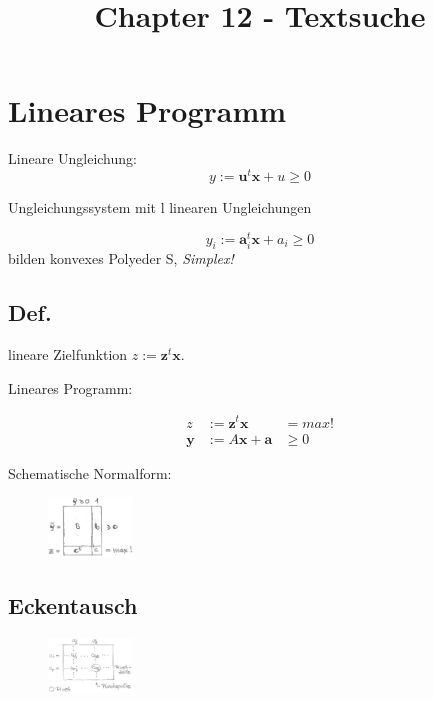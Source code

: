\documentclass[8pt, DIV15, twocolumn]{scrartcl}
\title{Chapter 12 - Textsuche}
\date{}
\begin{document}
\setlength{\abovedisplayskip}{0pt}
\setlength{\belowdisplayskip}{0pt}
\setlength{\parskip}{0pt}
\setlength{\topmargin}{0pt}

 
\maketitle

\thispagestyle{empty}


\section*{Lineares Programm}
Lineare Ungleichung:
\begin{equation*}
y := \mathbf{u}^t \mathbf{x} + u \geq 0
\end{equation*} 

Ungleichungssystem mit l linearen Ungleichungen

\begin{equation*}
y_i := \mathbf{a}_i^t \mathbf{x} + a_i \geq 0
\end{equation*} 
bilden konvexes Polyeder S, \emph{Simplex!}

\subsection*{Def.}
lineare Zielfunktion $z := \mathbf{z}^t \mathbf{x}$.

Lineares Programm:

\begin{equation*}
\begin{aligned}
z &:= \mathbf{z}^t \mathbf{x} &= max! \\
\mathbf{y} &:= A \mathbf{x} + \mathbf{a} &\geq 0
\end{aligned}
\end{equation*} 

Schematische Normalform:

\begin{figure}[ht]
	\centering
  \includegraphics[width=0.2\textwidth]{schematischeNormalform.png}
\end{figure}

\subsection*{Eckentausch}
\begin{figure}[ht]
	\centering
  \includegraphics[width=0.2\textwidth]{eckentausch.png}
\end{figure}
\end{document}
